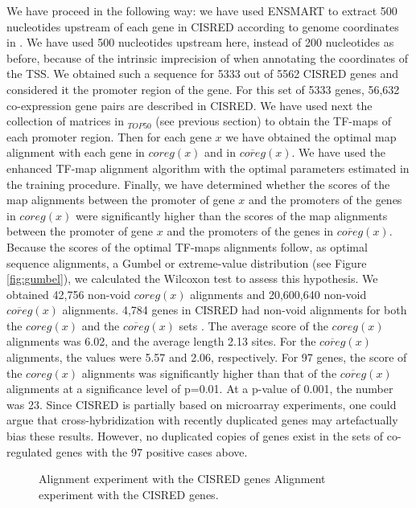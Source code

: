 We have proceed in the following way:
we have used ENSMART to extract 500 nucleotides
upstream of each gene in CISRED according to genome coordinates in 
\ensembl{}. We have used 500 nucleotides upstream here, instead of 
200 nucleotides as before, because of the intrinsic imprecision 
of \ensembl{} when annotating the coordinates of the TSS.  
We obtained such a sequence for 5333 out of 5562 CISRED genes
and considered it the promoter region of the gene. For this set of 
5333 genes, 56,632 co-expression gene pairs are described in CISRED.
We have used next the collection
of matrices in $_{TOP50}$ (see previous section) to obtain the
TF-maps of each promoter region. Then for each gene
$x$ we have obtained the optimal map alignment with each gene in
$coreg(x)$ and in $\overline{coreg}(x)$. We have used the enhanced 
TF-map alignment algorithm
with the optimal parameters estimated in the training procedure. 
Finally, we have determined whether
the scores of the map alignments between the promoter of gene $x$ and
the promoters of the genes in $coreg(x)$ were significantly higher
than the scores of the map alignments between the promoter of gene $x$
and the promoters of the genes in $\overline{coreg}(x)$. Because the
scores of the optimal TF-maps alignments follow, as optimal sequence
  
alignments, a Gumbel or extreme-value distribution (see Figure \ref{fig:gumbel}), 
we calculated the Wilcoxon test to assess this
hypothesis. We obtained 42,756 non-void $coreg(x)$ alignments and 
20,600,640 non-void $\overline{coreg}(x)$ alignments. 
4,784 genes in CISRED had non-void alignments for both the 
$coreg(x)$ and the $\overline{coreg}(x)$ sets . The
average score of the $coreg(x)$ alignments was 6.02, and the average
length 2.13 sites. For the $\overline{coreg}(x)$ alignments, the values were
5.57 and 2.06, respectively. For 97 genes,
the score of the $coreg(x)$ alignments was significantly
higher than that of the $\overline{coreg}(x)$ alignments at a
significance level of p=0.01. At a p-value of 0.001, the number was 23. 
Since CISRED is partially based on microarray
experiments, one could argue that cross-hybridization with recently
duplicated genes may artefactually bias these results. However, no 
duplicated copies of genes exist in the sets of co-regulated genes with 
the 97 positive cases above.

\begin{figure}[t!]
\begin{center}
\setlength{\fboxsep}{0pt}
          {Alignment experiment with the CISRED genes}%
          {Alignment experiment with the CISRED genes.}%
          {}
\end{center}
\end{figure}

